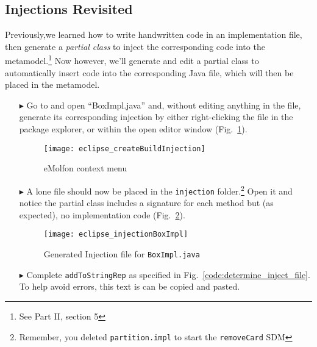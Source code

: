 \subsection{Injections Revisited}
\genHeader

Previously,we learned how to write handwritten code in an implementation file, then generate a \emph{partial class} to inject the corresponding code into the
metamodel.\footnote{See Part II, section 5} Now however, we'll generate and edit a partial class to automatically insert code into the corresponding Java file,
which will then be placed in the metamodel.

\begin{itemize}

\item[$\blacktriangleright$] Go to and open ``BoxImpl.java'' and, without editing anything in the file, generate its corresponding injection by
either right-clicking the file in the package explorer, or within the open editor window (Fig.~\ref{fig:createInjection}).

\vspace{0.5cm}

\begin{figure}[htbp]
    \centering
    \texttt{[image: eclipse\_createBuildInjection]}
    \caption{eMolfon context menu}
    \label{fig:createInjection}
\end{figure}

\clearpage

\item[$\blacktriangleright$] A lone file should now be placed in the \texttt{injection} folder.\footnote{Remember, you deleted \texttt{partition.impl} to start
the \texttt{removeCard} SDM} Open it and notice the partial class includes a signature for each method but (as expected), no implementation code
(Fig.~\ref{fig:injection_partialClassBox}).

\vspace{0.5cm}

\begin{figure}[htbp]
    \centering
    \texttt{[image: eclipse\_injectionBoxImpl]}
    \caption{Generated Injection file for \texttt{BoxImpl.java}}
    \label{fig:injection_partialClassBox}
\end{figure}

\vspace{0.5cm}

\item[$\blacktriangleright$] Complete \texttt{addToStringRep} as specified in Fig.~\ref{code:determine_inject_file}. To help avoid errors, this text is can be
copied and pasted.


\end{itemize}

